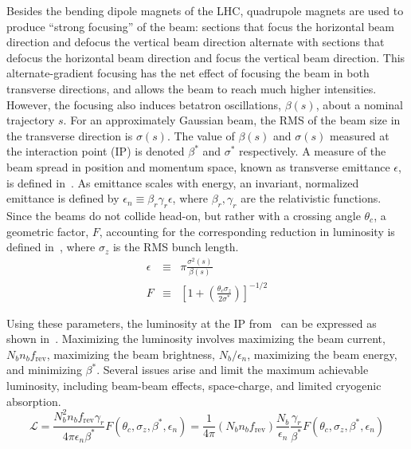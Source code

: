 Besides the bending dipole magnets of the LHC, quadrupole magnets are used to produce ``strong focusing'' of the beam: sections that focus the horizontal beam direction and defocus the vertical beam direction alternate with sections that defocus the horizontal beam direction and focus the vertical beam direction. This alternate-gradient focusing has the net effect of focusing the beam in both transverse directions, and allows the beam to reach much higher intensities. However, the focusing also induces betatron oscillations, $\beta(s)$, about a nominal trajectory $s$. For an approximately Gaussian beam, the RMS of the beam size in the transverse direction is $\sigma(s)$. The value of $\beta(s)$ and $\sigma(s)$ measured at the interaction point (IP) is denoted $\beta^*$ and $\sigma^*$ respectively. A measure of the beam spread in position and momentum space, known as transverse emittance $\epsilon$, is defined in~\Eqn{\ref{eqn:trans_emit}}. As emittance scales with energy, an invariant, normalized emittance is defined by $\epsilon_n\equiv \beta_r\gamma_r\epsilon$, where $\beta_r, \gamma_r$ are the relativistic functions. Since the beams do not collide head-on, but rather with a crossing angle $\theta_c$, a geometric factor, $F$, accounting for the corresponding reduction in luminosity is defined in~\Eqn{\ref{eqn:f_fact}}, where $\sigma_z$ is the RMS bunch length. 
\begin{eqnarray}
\epsilon&\equiv& \pi\frac{\sigma^2(s)}{\beta(s)} \label{eqn:trans_emit} \\
F &\equiv& \left[ 1+ \left(\frac{\theta_c\sigma_z}{2\sigma^{*}} \right) \right]^{-1/2} \label{eqn:f_fact} 
\end{eqnarray}

Using these parameters, the luminosity at the IP from~\Eqn{\ref{eqn:n_evts}} can be expressed as shown in~\Eqn{\ref{eqn:inst_lumi}}.  
Maximizing the luminosity involves maximizing the beam current, $N_bn_bf_{\textrm{rev}}$, maximizing the beam brightness, $N_b/\epsilon_n$, maximizing the beam energy, and minimizing $\beta^{*}$. Several issues arise and limit the maximum achievable luminosity, including beam-beam effects, space-charge, and limited cryogenic absorption.
\begin{equation}
\mathcal{L} = \frac{N_b^2n_bf_{\textrm{rev}}\gamma_r}{4\pi\epsilon_n\beta^{*}}F(\theta_c,\sigma_z,\beta^{*},\epsilon_n) = \frac{1}{4\pi}\left(N_bn_bf_{\textrm{rev}}\right)\frac{N_b}{\epsilon_n}\frac{\gamma_r}{\beta^{*}}F(\theta_c,\sigma_z,\beta^{*},\epsilon_n)
\label{eqn:inst_lumi}
\end{equation}

